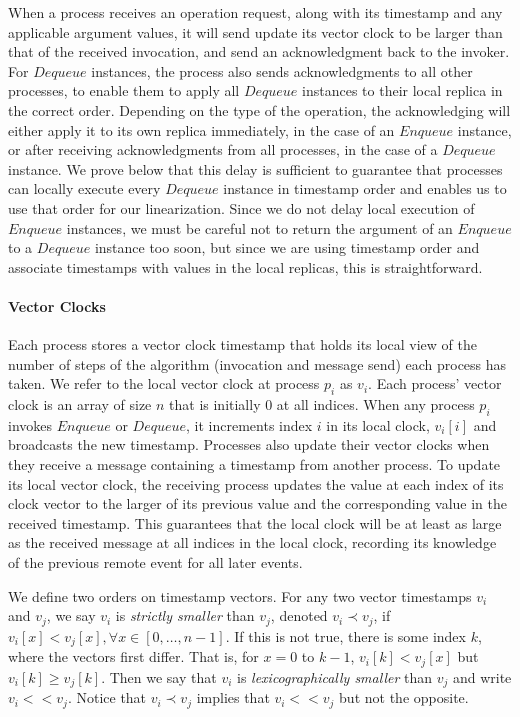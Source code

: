 \documentclass[a4paper,anonymous,USenglish]{lipics-v2021} %
\theoremstyle{definition}
\begin{document}
When a process receives an operation request, along with its timestamp and any applicable argument values, it will send update its vector clock to be larger than that of the received invocation, and send an acknowledgment back to the invoker.  For $Dequeue$ instances, the process also sends acknowledgments to all other processes, to enable them to apply all $Dequeue$ instances to their local replica in the correct order.  Depending on the type of the operation, the acknowledging will either apply it to its own replica immediately, in the case of an $Enqueue$ instance, or after receiving acknowledgments from all processes, in the case of a $Dequeue$ instance.  We prove below that this delay is sufficient to guarantee that processes can locally execute every $Dequeue$ instance in timestamp order and enables us to use that order for our linearization.  Since we do not delay local execution of $Enqueue$ instances, we must be careful not to return the argument of an $Enqueue$ to a $Dequeue$ instance too soon, but since we are using timestamp order and associate timestamps with values in the local replicas, this is straightforward.

\paragraph{Vector Clocks}  Each process stores a vector clock timestamp that holds its local view of the number of steps of the algorithm (invocation and message send) each process has taken.  We refer to the local vector clock at process $p_i$ as $v_i$.  Each process' vector clock is an array of size $n$ that is initially 0 at all indices.  When any process $p_i$ invokes $Enqueue$ or $Dequeue$, it increments index $i$ in its local clock, $v_i[i]$ and broadcasts the new timestamp.  Processes also update their vector clocks when they receive a message containing a timestamp from another process.  To update its local vector clock, the receiving process updates the value at each index of its clock vector to the larger of its previous value and the corresponding value in the received timestamp.  This guarantees that the local clock will be at least as large as the received message at all indices in the local clock, recording its knowledge of the previous remote event for all later events.

We define two orders on timestamp vectors.  For any two vector timestamps $v_i$ and $v_j$, we say $v_i$ is \emph{strictly smaller} than $v_j$, denoted $v_i \prec  v_j$, if $v_i[x] < v_j[x],\forall x \in [0, \dots, n-1]$.  If this is not true, there is some index $k$, where the vectors first differ.  That is, for $x = 0$ to $k-1$, $v_i[k] < v_j[x]$ but $v_i[k] \geq v_j [k]$.  Then we say that $v_i$ is \emph{lexicographically smaller} than $v_j$ and write $v_i << v_j$.  Notice that $v_i \prec v_j$ implies that $v_i << v_j$ but not the opposite.
\end{document}
